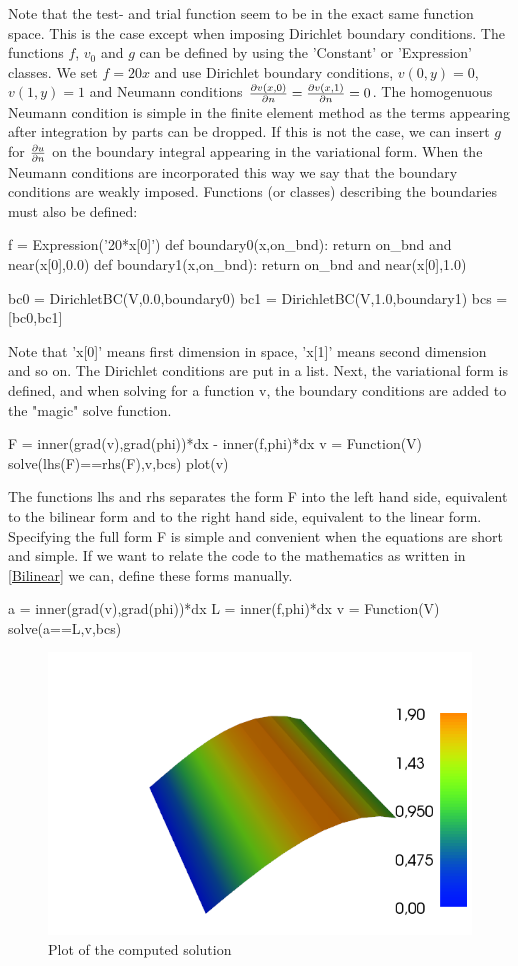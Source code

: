 Note that the test- and trial function seem to be in the exact same function space. This is the case except when imposing Dirichlet boundary conditions. 
The functions $f$, $v_0$ and $g$ can be defined by using the 'Constant' or 'Expression' classes. We set $f = 20x$ and use Dirichlet boundary conditions, $v(0,y) = 0$, $v(1,y) = 1$ and Neumann conditions $\frac{\partial v(x,0)}{\partial n} = \frac{\partial v(x,1)}{\partial n} = 0$. The homogenuous Neumann condition is simple in the finite element method as the terms appearing after integration by parts can be dropped. If this is not the case, we can insert $g$ for $\frac{\partial u}{\partial n}$ on the boundary integral appearing in the variational form. When the Neumann conditions are incorporated this way we say that the boundary conditions are weakly imposed. Functions (or classes) describing the boundaries must also be defined:
\begin{cverbatim}
f = Expression('20*x[0]')
def boundary0(x,on_bnd):
	return on_bnd and near(x[0],0.0)
def boundary1(x,on_bnd):
	return on_bnd and near(x[0],1.0)

bc0 = DirichletBC(V,0.0,boundary0)
bc1 = DirichletBC(V,1.0,boundary1)
bcs = [bc0,bc1]
\end{cverbatim}
Note that 'x[0]' means first dimension in space, 'x[1]' means second dimension and so on. The Dirichlet conditions are put in a list. Next, the variational form is defined, and when solving for a function v, the boundary conditions are added to the "magic" solve function. 
\begin{cverbatim}
F = inner(grad(v),grad(phi))*dx - inner(f,phi)*dx
v = Function(V)
solve(lhs(F)==rhs(F),v,bcs)
plot(v)
\end{cverbatim}
The functions lhs and rhs separates the form F into the left hand side, equivalent to the bilinear form and to the right hand side, equivalent to the linear form. Specifying the full form F is simple and convenient when the equations are short and simple. If we want to relate the code to the mathematics as written in \eqref{Bilinear} we can, define these forms manually. 
\begin{cverbatim}
a = inner(grad(v),grad(phi))*dx
L = inner(f,phi)*dx
v = Function(V)
solve(a==L,v,bcs)
\end{cverbatim}
\begin{figure}[!h]
\includegraphics[scale=0.5]{figures/poisson_f_20x}
\caption{Plot of the computed solution}
\end{figure}
